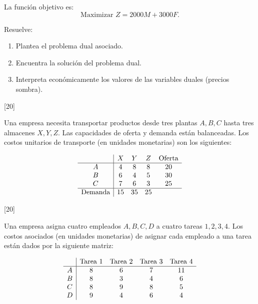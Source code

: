 \documentclass[11pt,paper=a4,answers, addpoints]{exam}
\begin{document}
\begin{questions}
La función objetivo es:
\[
\text{Maximizar } Z = 2000M + 3000F.
\]

Resuelve:
\begin{enumerate}
    \item Plantea el problema dual asociado.
    \item Encuentra la solución del problema dual.
    \item Interpreta económicamente los valores de las variables duales (precios sombra).
\end{enumerate}

[20]

Una empresa necesita transportar productos desde tres plantas \(A, B, C\) hasta tres almacenes \(X, Y, Z\). Las capacidades de oferta y demanda están balanceadas. Los costos unitarios de transporte (en unidades monetarias) son los siguientes:

\[
\begin{array}{c|c c c c}
 & X & Y & Z & \text{Oferta} \\
\hline
A & 4 & 8 & 8 & 20 \\
B & 6 & 4 & 5 & 30 \\
C & 7 & 6 & 3 & 25 \\
\hline
\text{Demanda} & 15 & 35 & 25 &
\end{array}
\]


[20]

Una empresa asigna cuatro empleados \(A, B, C, D\) a cuatro tareas \(1, 2, 3, 4\). Los costos asociados (en unidades monetarias) de asignar cada empleado a una tarea están dados por la siguiente matriz:

\[
\begin{array}{c|c c c c}
 & \text{Tarea 1} & \text{Tarea 2} & \text{Tarea 3} & \text{Tarea 4} \\
\hline
A & 8 & 6 & 7 & 11 \\
B & 8 & 3 & 4 & 6 \\
C & 8 & 9 & 8 & 5 \\
D & 9 & 4 & 6 & 4
\end{array}
\]


\end{questions}
\end{document}
